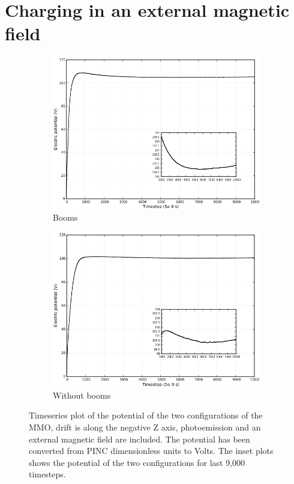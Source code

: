\section{Charging in an external magnetic field}

\begin{figure}[H]
  \begin{subfigure}[b]{0.75\textwidth}
  \includegraphics[width=\columnwidth]{figures/MMO/BField/WB/C_BField_WB.png}
  \caption{Booms}
  \label{fig:C_BField_WB}
\end{subfigure}
\par\bigskip
\begin{subfigure}[b]{0.75\textwidth}
  \includegraphics[width=\columnwidth]{figures/MMO/BField/NB/C_BField_NB.png}
  \caption{Without booms}
  \label{fig:C_BField_NB}
\end{subfigure}
\label{fig:Conv_BField}
\caption{Timeseries plot of the potential of the two configurations of the MMO, drift is along the negative Z axis, photoemission and an external magnetic field are included. The potential has been converted from PINC dimensionless units to Volts. The inset plots shows the potential of the two configurations for last 9,000 timesteps.}
\end{figure}


